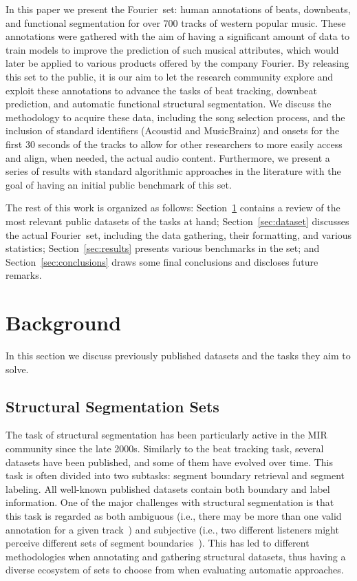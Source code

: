 \documentclass{article}
\newcommand{\setName}{Fourier}
\begin{document}
In this paper we present the \setName~set: human annotations of beats, downbeats, and functional segmentation for over 700 tracks of western popular music.
These annotations were gathered with the aim of having a significant amount of data to train models to improve the prediction of such musical attributes, which would later be applied to various products offered by the company \setName.
By releasing this set to the public, it is our aim to let the research community explore and exploit these annotations to advance the tasks of beat tracking, downbeat prediction, and automatic functional structural segmentation.
We discuss the methodology to acquire these data, including the song selection process, and the inclusion of standard identifiers (Acoustid and MusicBrainz) and onsets for the first 30 seconds of the tracks to allow for other researchers to more easily access and align, when needed, the actual audio content.
Furthermore, we present a series of results with standard algorithmic approaches in the literature with the goal of having an initial public benchmark of this set.

The rest of this work is organized as follows: Section~\ref{sec:background} contains a review of the most relevant public datasets of the tasks at hand; Section~\ref{sec:dataset} discusses the actual \setName~set, including the data gathering, their formatting, and various statistics; Section~\ref{sec:results} presents various benchmarks in the set; and Section~\ref{sec:conclusions} draws some final conclusions and discloses future remarks.
%
\section{Background}\label{sec:background}

In this section we discuss previously published datasets and the tasks they aim to solve.



\subsection{Structural Segmentation Sets}

The task of structural segmentation has been particularly active in the MIR community since the late 2000s.
Similarly to the beat tracking task, several datasets have been published, and some of them have evolved over time.
This task is often divided into two subtasks: segment boundary retrieval and segment labeling.
All well-known published datasets contain both boundary and label information.
One of the major challenges with structural segmentation is that this task is regarded as both ambiguous (i.e., there may be more than one valid annotation for a given track~\cite{McFee2017}) and subjective (i.e., two different listeners might perceive different sets of segment boundaries~\cite{Bruderer2009}).
This has led to different methodologies when annotating and gathering structural datasets, thus having a diverse ecosystem of sets to choose from when evaluating automatic approaches.
\end{document}
